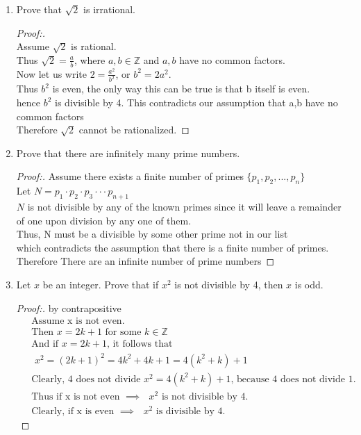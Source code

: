 \documentclass[11pt]{article}
\begin{document}
\begin{enumerate}
    \item Prove that $\sqrt{2}$ is irrational.
        \begin{proof}[Proof:\nopunct] \\ 
             Assume $\sqrt{2}$ is rational. 
             \\ Thus $\sqrt{2} = \frac{a}{b}$, where $a,b \in \mathbb{Z}$ and $a,b$ have no common factors.
             \\ Now let us write $2 = \frac{a^2}{b^2}$, or $b^2=2a^2$.
             \\ Thus $b^2$ is even, the only way this can be true is that b itself is even.
             \\ hence $b^2$ is divisible by 4. This contradicts our assumption that a,b have no common factors
             \\ Therefore $\sqrt{2}$ cannot be rationalized.
        \end{proof}
        
    \item Prove that there are infinitely many prime numbers.
        \begin{proof}[Proof:\nopunct]
            Assume there exists a finite number of primes $\{p_1, p_2, ... , p_n \}$ 
            \\ Let $N = p_1\cdot p_2 \cdot p_3 \cdot \cdot \cdot p_{n+1}$
            \\ $N$ is not divisible by any of the known primes since it will leave a remainder of one upon division by any one of them.
            \\ Thus, N must be a divisible by some other prime not in our list
            \\ which contradicts the assumption that there is a finite number of primes.
            \\ Therefore There are an infinite number of prime numbers
        \end{proof}
        
    \item Let $x$ be an integer. Prove that if $x^2$ is not divisible by 4, then $x$ is odd.
        \begin{proof}[Proof:\nopunct] by contrapositive
            \begin{align*}
                & \text{ Assume x is not even.} \\
                & \text{ Then $x = 2k + 1$ for some $k\in \mathbb{Z}$ }\\
                & \text{ And if $x = 2k + 1$, it follows that }\\
                & \text{ $x^2 = (2k+1)^2= 4k^2 + 4k + 1 = 4(k^2+k)+1$}\\
                & \text{ Clearly, 4 does not divide $x^2=4(k^2+k)+1$, because 4 does not divide 1.}\\
                & \text{ Thus if x is not even $\implies$ $x^2$ is not divisible by 4.}\\
                & \text{ Clearly, if x is even $\implies$ $x^2$ is divisible by 4.}
            \end{align*}
        \end{proof}
        

\end{enumerate}
\end{document}
